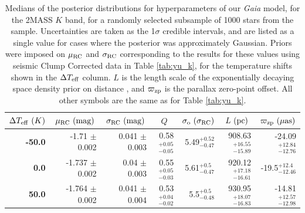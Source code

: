 \documentclass[fleqn,usenatbib]{mnras}
\newcommand{\oozp}{\mbox{$\varpi_{\rm zp}$}\xspace}
\newcommand{\murc}{\mbox{$\mu_{\rm RC}$}\xspace}
\newcommand{\sigrc}{\mbox{$\sigma_{\rm RC}$}\xspace}
\newcommand{\teff}{\mbox{$T_{\rm eff}$}\xspace}
\newcommand{\gaia}{\emph{Gaia}\xspace}
\begin{document}
\begin{table}
    \begin{tabular}{rrrrrrr}
    \toprule
    \multicolumn{1}{c}{$\Delta T_{\rm eff}\ (K)$} & \multicolumn{1}{c}{$\mu_{\rm RC}\ (\rm mag)$} & \multicolumn{1}{c}{$\sigma_{\rm RC}\ (\rm mag)$}  & \multicolumn{1}{c}{$Q$} &  \multicolumn{1}{c}{$\sigma_{\rm o}\ (\sigma_{\rm RC})$} & \multicolumn{1}{c}{$L\ (\rm pc)$} & \multicolumn{1}{c}{$\varpi_{\rm zp}\ (\mu \rm as)$} \\
    \midrule
        \textbf{-50.0} &  -1.71 $\pm$ 0.002 &  0.041 $\pm$ 0.003 &  0.58$_{-0.05}^{+0.05}$ &  5.49$_{-0.47}^{+0.52}$ &  908.63$_{-15.89}^{+16.55}$ & -24.09$_{-12.76}^{+12.84}$ \\
        \textbf{0.0  } & -1.737 $\pm$ 0.002 &   0.04 $\pm$ 0.003 &  0.55$_{-0.03}^{+0.05}$ &  5.61$_{-0.47}^{+ 0.5}$ &  920.12$_{-16.61}^{+17.18}$ &  -19.5$_{-12.46}^{+ 12.4}$ \\
        \textbf{50.0 } & -1.764 $\pm$ 0.002 &  0.041 $\pm$ 0.004 &  0.53$_{-0.02}^{+0.04}$ &   5.5$_{-0.48}^{+ 0.5}$ &  930.95$_{-16.83}^{+18.07}$ & -14.81$_{-12.98}^{+12.57}$ \\
    \bottomrule
    \end{tabular}
\caption{Medians of the posterior distributions for hyperparameters of our \gaia model, for the 2MASS $K$ band, for a randomly selected subsample of 1000 stars from the  sample. Uncertainties are taken as the 1$\sigma$ credible intervals, and are listed as a single value for cases where the posterior was approximately Gaussian. Priors were imposed on \murc and \sigrc corresponding to the results for these values using seismic Clump Corrected data in Table \ref{tab:yu_k}, for the temperature shifts shown in the $\Delta\teff$ column. $L$ is the length scale of the exponentially decaying space density prior on distance \citep{art:bailer-jones+2018}, and \oozp is the parallax zero-point offset. All other symbols are the same as for Table \ref{tab:yu_k}.}
\label{tab:gaia_yu_k}
\end{table}
\end{document}
